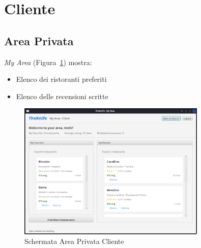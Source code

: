 \section{Cliente}
\subsection{Area Privata}
\emph{My Area} (Figura~\ref{fig:myarea-client}) mostra:
\begin{itemize}
    \item Elenco dei ristoranti preferiti
    \item Elenco delle recensioni scritte
\end{itemize}

\begin{figure}[H]
    \centering
    \includegraphics[width=0.8\textwidth]{images/myarea-client.png}
    \caption{Schermata Area Privata Cliente}
    \label{fig:myarea-client}
\end{figure}

